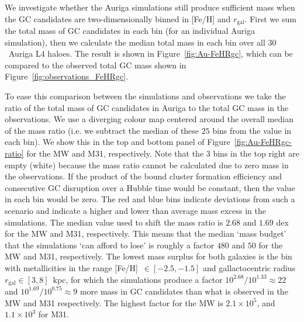 \documentclass[a4paper,fleqn,usenatbib]{mnras}
\begin{document}
We investigate whether the Auriga simulations still produce sufficient mass when
the GC candidates are two-dimensionally binned in [Fe/H] and $r_\text{gal}$. First
we sum the total mass of GC candidates in each bin (for an individual Auriga 
simulation), then we calculate the median total mass in each bin over all 
$30$~Auriga L4 haloes. The result is shown in Figure~\ref{fig:Au-FeHRgc}, which 
can be compared to the observed total GC mass shown in 
Figure~\ref{fig:observations_FeHRgc}.

To ease this comparison between the simulations and observations we take the ratio
of the total mass of GC candidates in Auriga to the total GC mass in the observations.
We use a diverging colour map centered around the overall median of the 
mass ratio (i.e. we subtract the median of these $25$ bins from the value 
in each bin). We show this in the top and bottom panel of Figure~\ref{fig:Au-FeHRgc-ratio}
for the MW and M31, respectively. Note that the 3 bins in the top right are empty (white)
because the mass ratio cannot be calculated due to zero mass in the observations.
If the product of the bound cluster formation efficiency and consecutive GC 
disruption over a Hubble time would be constant, then the value in each bin would
be zero. The red and blue bins indicate deviations from such a scenario and
indicate a higher and lower than average mass excess in the simulations. The median 
value used to shift the mass ratio is $2.68$ and $1.69$ dex for the MW and M31, 
respectively. This means that the median `mass budget' that the simulations `can 
afford to lose' is roughly a factor $480$ and $50$ for the MW and M31, respectively. 
The lowest mass surplus for both galaxies is the bin with metallicities in the range
[Fe/H]~$\in [-2.5, -1.5]$ and gallactocentric radius $r_{\text{gal}}\in [3,8]$~kpc,
for which the simulations produce 
a factor $10^{2.68}/10^{1.33} \approx 22$ and $10^{1.69}/10^{0.75} \approx 9$ 
more mass in GC candidates than what is observed in the MW and M31 respectively.
The highest factor for the MW is $2.1 \times 10^{5}$, and $1.1 \times 10^{3}$
for M31.
\end{document}
